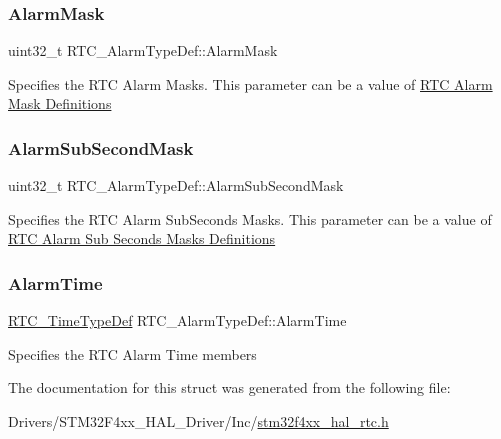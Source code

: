 \subsubsection{\texorpdfstring{Alarm\+Mask}{AlarmMask}}
{\footnotesize\ttfamily uint32\+\_\+t R\+T\+C\+\_\+\+Alarm\+Type\+Def\+::\+Alarm\+Mask}

Specifies the R\+TC Alarm Masks. This parameter can be a value of \hyperlink{group___r_t_c___alarm_mask___definitions}{R\+TC Alarm Mask Definitions} \mbox{\label{struct_r_t_c___alarm_type_def_aa7f311cd270c215530acf93b454db223}} 
\subsubsection{\texorpdfstring{Alarm\+Sub\+Second\+Mask}{AlarmSubSecondMask}}
{\footnotesize\ttfamily uint32\+\_\+t R\+T\+C\+\_\+\+Alarm\+Type\+Def\+::\+Alarm\+Sub\+Second\+Mask}

Specifies the R\+TC Alarm Sub\+Seconds Masks. This parameter can be a value of \hyperlink{group___r_t_c___alarm___sub___seconds___masks___definitions}{R\+TC Alarm Sub Seconds Masks Definitions} \mbox{\label{struct_r_t_c___alarm_type_def_a1e50b47e1b3cb1cf09dee1b9e61028c6}} 
\subsubsection{\texorpdfstring{Alarm\+Time}{AlarmTime}}
{\footnotesize\ttfamily \hyperlink{struct_r_t_c___time_type_def}{R\+T\+C\+\_\+\+Time\+Type\+Def} R\+T\+C\+\_\+\+Alarm\+Type\+Def\+::\+Alarm\+Time}

Specifies the R\+TC Alarm Time members 

The documentation for this struct was generated from the following file\+:\begin{DoxyCompactItemize}
\item 
Drivers/\+S\+T\+M32\+F4xx\+\_\+\+H\+A\+L\+\_\+\+Driver/\+Inc/\hyperlink{stm32f4xx__hal__rtc_8h}{stm32f4xx\+\_\+hal\+\_\+rtc.\+h}\end{DoxyCompactItemize}
